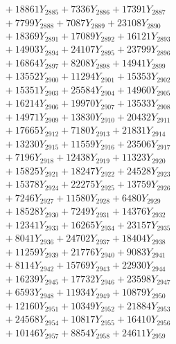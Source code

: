 \documentclass[a4paper,10pt]{article}
\begin{document}
{\begin{align}
&\;  + 18861 Y_{2885} + 7336 Y_{2886} + 17391 Y_{2887} \\[0.3ex]
&\;  + 7799 Y_{2888} + 7087 Y_{2889} + 23108 Y_{2890} \\[0.3ex]
&\;  + 18369 Y_{2891} + 17089 Y_{2892} + 16121 Y_{2893} \\[0.3ex]
&\;  + 14903 Y_{2894} + 24107 Y_{2895} + 23799 Y_{2896} \\[0.3ex]
&\;  + 16864 Y_{2897} + 8208 Y_{2898} + 14941 Y_{2899} \\[0.3ex]
&\;  + 13552 Y_{2900} + 11294 Y_{2901} + 15353 Y_{2902} \\[0.3ex]
&\;  + 15351 Y_{2903} + 25584 Y_{2904} + 14960 Y_{2905} \\[0.3ex]
&\;  + 16214 Y_{2906} + 19970 Y_{2907} + 13533 Y_{2908} \\[0.5ex]\allowbreak
&\;  + 14971 Y_{2909} + 13830 Y_{2910} + 20432 Y_{2911} \\[0.3ex]
&\;  + 17665 Y_{2912} + 7180 Y_{2913} + 21831 Y_{2914} \\[0.3ex]
&\;  + 13230 Y_{2915} + 11559 Y_{2916} + 23506 Y_{2917} \\[0.3ex]
&\;  + 7196 Y_{2918} + 12438 Y_{2919} + 11323 Y_{2920} \\[0.3ex]
&\;  + 15825 Y_{2921} + 18247 Y_{2922} + 24528 Y_{2923} \\[0.3ex]
&\;  + 15378 Y_{2924} + 22275 Y_{2925} + 13759 Y_{2926} \\[0.3ex]
&\;  + 7246 Y_{2927} + 11580 Y_{2928} + 6480 Y_{2929} \\[0.3ex]
&\;  + 18528 Y_{2930} + 7249 Y_{2931} + 14376 Y_{2932} \\[0.3ex]
&\;  + 12341 Y_{2933} + 16265 Y_{2934} + 23157 Y_{2935} \\[0.3ex]
&\;  + 8041 Y_{2936} + 24702 Y_{2937} + 18404 Y_{2938} \\[0.5ex]\allowbreak
&\;  + 11259 Y_{2939} + 21776 Y_{2940} + 9083 Y_{2941} \\[0.3ex]
&\;  + 8114 Y_{2942} + 15769 Y_{2943} + 22930 Y_{2944} \\[0.3ex]
&\;  + 16239 Y_{2945} + 17732 Y_{2946} + 23598 Y_{2947} \\[0.3ex]
&\;  + 6593 Y_{2948} + 11934 Y_{2949} + 10879 Y_{2950} \\[0.3ex]
&\;  + 12160 Y_{2951} + 10349 Y_{2952} + 21884 Y_{2953} \\[0.3ex]
&\;  + 24568 Y_{2954} + 10817 Y_{2955} + 16410 Y_{2956} \\[0.3ex]
&\;  + 10146 Y_{2957} + 8854 Y_{2958} + 24611 Y_{2959} \\[0.3ex]

\end{align}}
\end{document}

